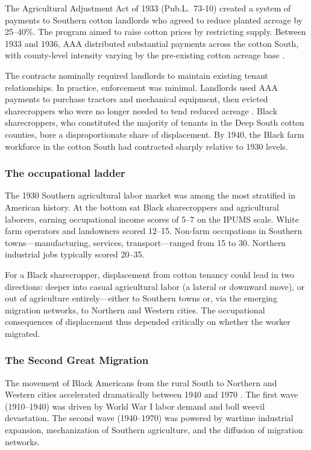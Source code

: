 \documentclass[12pt]{article}
\begin{document}
The Agricultural Adjustment Act of 1933 (Pub.L.\ 73-10) created a system of payments to Southern cotton landlords who agreed to reduce planted acreage by 25--40\%. The program aimed to raise cotton prices by restricting supply. Between 1933 and 1936, AAA distributed substantial payments across the cotton South, with county-level intensity varying by the pre-existing cotton acreage base \citep{fishback2003new}.

The contracts nominally required landlords to maintain existing tenant relationships. In practice, enforcement was minimal. Landlords used AAA payments to purchase tractors and mechanical equipment, then evicted sharecroppers who were no longer needed to tend reduced acreage \citep{alston1999paternalism, whatley1983labor}. Black sharecroppers, who constituted the majority of tenants in the Deep South cotton counties, bore a disproportionate share of displacement. By 1940, the Black farm workforce in the cotton South had contracted sharply relative to 1930 levels.

\subsubsection*{The occupational ladder} The 1930 Southern agricultural labor market was among the most stratified in American history. At the bottom sat Black sharecroppers and agricultural laborers, earning occupational income scores of 5--7 on the IPUMS scale. White farm operators and landowners scored 12--15. Non-farm occupations in Southern towns---manufacturing, services, transport---ranged from 15 to 30. Northern industrial jobs typically scored 20--35.

For a Black sharecropper, displacement from cotton tenancy could lead in two directions: deeper into casual agricultural labor (a lateral or downward move), or out of agriculture entirely---either to Southern towns or, via the emerging migration networks, to Northern and Western cities. The occupational consequences of displacement thus depended critically on whether the worker migrated.

\subsubsection*{The Second Great Migration} The movement of Black Americans from the rural South to Northern and Western cities accelerated dramatically between 1940 and 1970 \citep{boustan2016competition}. The first wave (1910--1940) was driven by World War I labor demand and boll weevil devastation. The second wave (1940--1970) was powered by wartime industrial expansion, mechanization of Southern agriculture, and the diffusion of migration networks.
\end{document}
